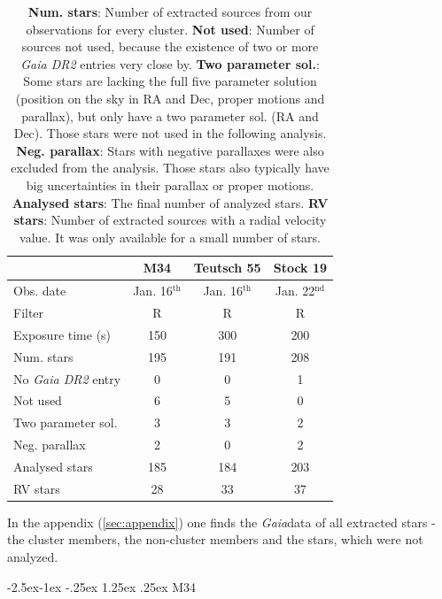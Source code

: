 \documentclass{article}
\makeatletter
\renewcommand\paragraph{\@startsection{paragraph}{4}{\z@}%
            {-2.5ex\@plus -1ex \@minus -.25ex}%
            {1.25ex \@plus .25ex}%
            {\normalfont\normalsize\bfseries}}
\makeatother
\begin{document}
\begin{table}[H]
\centering
\caption{\textbf{Num. stars}: Number of extracted sources from our observations for every cluster. \textbf{Not used}: Number of sources not used, because the existence of two or more \textit{Gaia DR2} entries very close by. \textbf{Two parameter sol.}: Some stars are lacking the full five parameter solution (position on the sky in RA and Dec, proper motions and parallax), but only have a two parameter sol. (RA and Dec). Those stars were not used in the following analysis. \textbf{Neg. parallax}: Stars with negative parallaxes were also excluded from the analysis. Those stars also typically have big uncertainties in their parallax or proper motions. \textbf{Analysed stars}: The final number of analyzed stars. \textbf{RV stars}: Number of extracted sources with a radial velocity value. It was only available for a small number of stars.}
\label{tab:sources}
\begin{tabular}{l|c|c|c}
                   & M34       & Teutsch 55 & Stock 19  \\ \hline
Obs. date          & Jan. 16$^{\text{th}}$ & Jan. 16$^{\text{th}}$  & Jan. 22$^{\text{nd}}$ \\
Filter             & R         & R          & R         \\
Exposure time (s)  & 150       & 300        & 200       \\ \hline
Num. stars         & 195       & 191        & 208       \\
No \textit{Gaia DR2} entry  & 0         & 0          & 1         \\
Not used           & 6         & 5          & 0         \\
Two parameter sol. & 3         & 3          & 2         \\
Neg. parallax      & 2         & 0          & 2         \\
Analysed stars     & 185       & 184        & 203       \\
RV stars           & 28        & 33         & 37       
\end{tabular}
\end{table}

In the appendix (\ref{sec:appendix}) one finds the \textit{Gaia}data of all extracted stars - the cluster members, the non-cluster members and the stars, which were not analyzed. 

\paragraph{M34}
\end{document}
